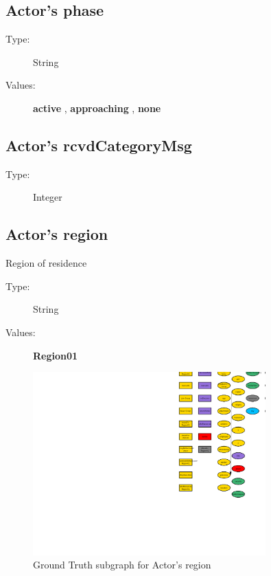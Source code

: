 \documentclass{article}%
\begin{document}
%
\subsection{Actor's phase}%
\label{subsec:Actor's phase}%
\begin{description}%
\item[Type:]%
String%
\item[Values:]%
\textbf{active}%
, %
\textbf{approaching}%
, %
\textbf{none}%
\end{description}

%
\subsection{Actor's rcvdCategoryMsg}%
\label{subsec:Actor's rcvdCategoryMsg}%
\begin{description}%
\item[Type:]%
Integer%
\end{description}

%
\subsection{Actor's region}%
\label{subsec:Actor's region}%
Region of residence%
\begin{description}%
\item[Type:]%
String%
\item[Values:]%
\textbf{Region01}%
\end{description}%


\begin{figure}[ht]%
\centering%
\includegraphics[width=0.8\textwidth]{images/regionOfActor.png}%
\caption{Ground Truth subgraph for Actor's region}%
\end{figure}
\end{document}

